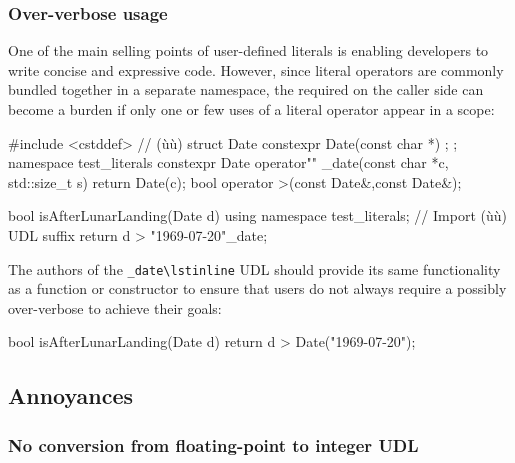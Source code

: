 \subsubsection[Over-verbose usage]{Over-verbose usage}

One of the main selling points of user-defined literals is enabling developers to write concise and expressive code. However, since literal operators are commonly bundled together in a separate namespace, the required  on the caller side can become a burden if only one or few uses of a literal operator appear in a scope:

\begin{emcppshiddenlisting}[emcppsbatch={e23,e24}]
#include <cstddef>  // (ù{}ù)
struct Date {
constexpr Date(const char *) {};
};
namespace test_literals {
constexpr Date operator"" _date(const char *c, std::size_t s) { return Date(c); }
}
bool operator >(const Date&,const Date&);
\end{emcppshiddenlisting}
\begin{emcppslisting}[emcppsbatch=e23]
bool isAfterLunarLanding(Date d)
{
    using namespace test_literals;  // Import (ù{}ù) UDL suffix
    return d > "1969-07-20"_date;
}
\end{emcppslisting}

\noindent The authors of the \lstinline!_date\lstinline! UDL should provide its same functionality as a function or constructor to ensure that users do not always require a possibly over-verbose  to achieve their goals:

\begin{emcppslisting}[emcppsbatch=e24]
bool isAfterLunarLanding(Date d)
{
    return d > Date("1969-07-20");
}
\end{emcppslisting}

    

\subsection[Annoyances]{Annoyances}\label{annoyances}

\subsubsection[No conversion from floating-point to integer \lstinline!UDL!]{No conversion from floating-point to integer {\SubsubsecCode UDL}}\label{no-conversion-from-floating-point-to-integer-udl}

